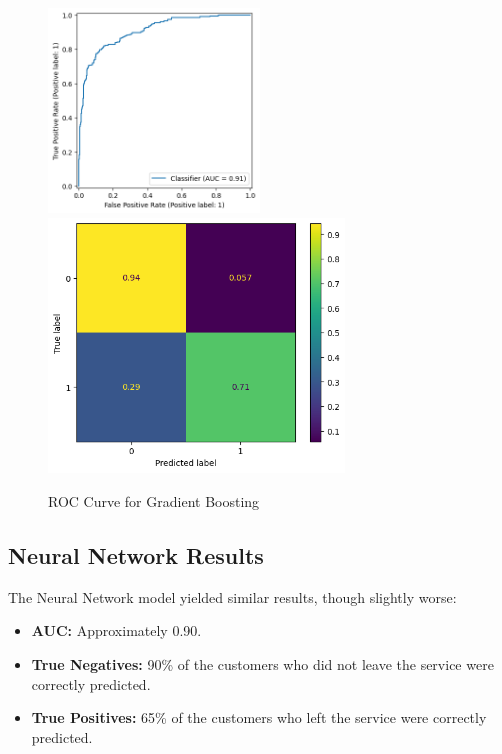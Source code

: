 \documentclass[12pt]{article}
\begin{document}
\begin{figure}[h!]
    \centering
    \includegraphics[width=0.5\textwidth]{figures/roc_curve_gb.png}
    \includegraphics[width=0.7\textwidth]{figures/confusion_matrix_gb.png}
    \caption{ROC Curve for Gradient Boosting}
    \label{fig:roc_curve_gb}
\end{figure}


\subsection{Neural Network Results}
The Neural Network model yielded similar results, though slightly worse:
\begin{itemize}
    \item \textbf{AUC:} Approximately 0.90.
    \item \textbf{True Negatives:} 90\% of the customers who did not leave the service were correctly predicted.
    \item \textbf{True Positives:} 65\% of the customers who left the service were correctly predicted.
\end{itemize}
\end{document}
